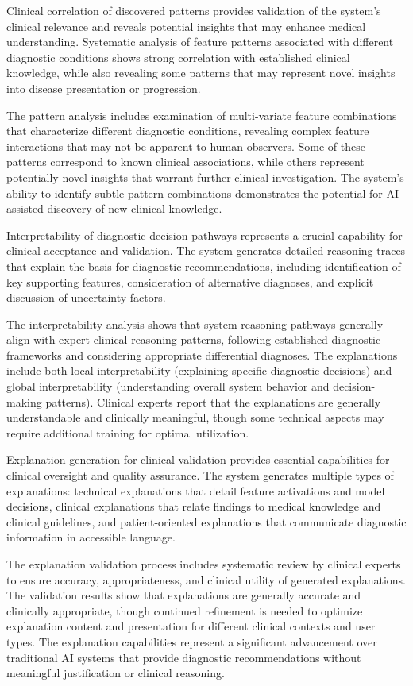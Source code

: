 Clinical correlation of discovered patterns provides validation of the system's clinical relevance and reveals potential insights that may enhance medical understanding. Systematic analysis of feature patterns associated with different diagnostic conditions shows strong correlation with established clinical knowledge, while also revealing some patterns that may represent novel insights into disease presentation or progression.

The pattern analysis includes examination of multi-variate feature combinations that characterize different diagnostic conditions, revealing complex feature interactions that may not be apparent to human observers. Some of these patterns correspond to known clinical associations, while others represent potentially novel insights that warrant further clinical investigation. The system's ability to identify subtle pattern combinations demonstrates the potential for AI-assisted discovery of new clinical knowledge.

Interpretability of diagnostic decision pathways represents a crucial capability for clinical acceptance and validation. The system generates detailed reasoning traces that explain the basis for diagnostic recommendations, including identification of key supporting features, consideration of alternative diagnoses, and explicit discussion of uncertainty factors.

The interpretability analysis shows that system reasoning pathways generally align with expert clinical reasoning patterns, following established diagnostic frameworks and considering appropriate differential diagnoses. The explanations include both local interpretability (explaining specific diagnostic decisions) and global interpretability (understanding overall system behavior and decision-making patterns). Clinical experts report that the explanations are generally understandable and clinically meaningful, though some technical aspects may require additional training for optimal utilization.

Explanation generation for clinical validation provides essential capabilities for clinical oversight and quality assurance. The system generates multiple types of explanations: technical explanations that detail feature activations and model decisions, clinical explanations that relate findings to medical knowledge and clinical guidelines, and patient-oriented explanations that communicate diagnostic information in accessible language.

The explanation validation process includes systematic review by clinical experts to ensure accuracy, appropriateness, and clinical utility of generated explanations. The validation results show that explanations are generally accurate and clinically appropriate, though continued refinement is needed to optimize explanation content and presentation for different clinical contexts and user types. The explanation capabilities represent a significant advancement over traditional AI systems that provide diagnostic recommendations without meaningful justification or clinical reasoning.

